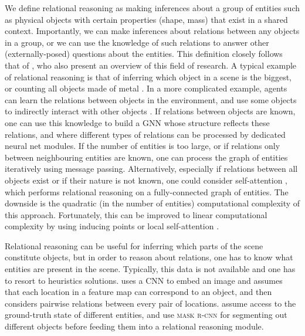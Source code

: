 	We define relational reasoning as making inferences about a group of entities such as physical objects with certain properties (shape, mass) that exist in a shared context.
	 Importantly, we can make inferences about relations between any objects in a group, or we can use the knowledge of such relations to answer other (externally-posed) questions about the entities.
	 This definition closely follows that of \cite{Battaglia2018relnets}, who also present an overview of this field of research. 
	 A typical example of relational reasoning is that of inferring which object in a scene is the biggest, or counting all objects made of metal \citep{Santoro2017}.
	 In a more complicated example, agents can learn the relations between objects in the environment, and use some objects to indirectly interact with other objects \citep{Baker2019tooluse}.
	 If relations between objects are known, one can use this knowledge to build a \gls{GNN} \citep{Schlichtkrull2017relgraph} whose structure reflects these relations, and where different types of relations can be processed by dedicated neural net modules.
	 If the number of entities is too large, or if relations only between neighbouring entities are known, one can process the graph of entities iteratively using message passing.
	 Alternatively, especially if relations between all objects exist or if their nature is not known, one could consider self-attention \citep{Vaswani17}, which performs relational reasoning on a fully-connected graph of entities.
	 The downside is the quadratic (in the number of entities) computational complexity of this approach.
	 Fortunately, this can be improved to linear computational complexity by using inducing points \citep{Lee2019set} or local self-attention \citep{Ramachandran2019standalone}.
	 
	 Relational reasoning can be useful for inferring which parts of the scene constitute objects, but in order to reason about relations, one has to know what entities are present in the scene. 
	 Typically, this data is not available and one has to resort to heuristics solutions.
	 \cite{Santoro2017} uses a \gls{CNN} to embed an image and assumes that each location in a feature map can correspond to an object, and then considers pairwise relations between every pair of locations.
	 \cite{Battaglia2016,Baker2019tooluse} assume access to the ground-truth state of different entities,
	 and \cite{Yi2019cleverer} use \textsc{mask r-cnn} \citep{He2017maskrcnn} for segmenting out different objects before feeding them into a relational reasoning module.


